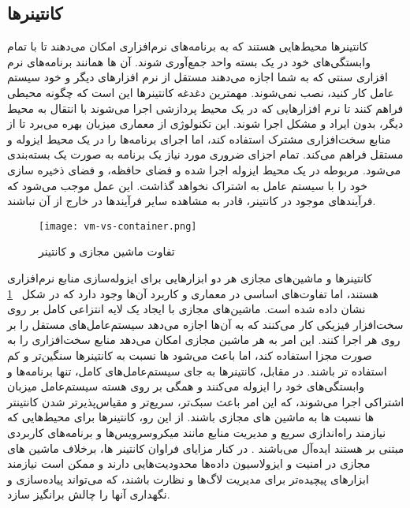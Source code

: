 \subsection{کانتینرها}

کانتینرها محیط‌هایی هستند که به برنامه‌های نرم‌افزاری امکان می‌دهند تا با تمام وابستگی‌های خود در یک بسته واحد جمع‌آوری شوند. آن ها همانند برنامه‌های نرم افزاری سنتی که به شما اجازه می‌دهند مستقل از نرم افزارهای دیگر و خود سیستم عامل کار کنید، نصب نمی‌شوند. مهمترین دغدغه کانتینرها این  است که چگونه محیطی فراهم کنند تا نرم افزارهایی که در یک محیط پردازشی اجرا می‌شوند با انتقال به محیط دیگر، بدون ایراد و مشکل اجرا شوند. این تکنولوژی از معماری میزبان بهره می‌برد تا از منابع سخت‌افزاری مشترک استفاده کند، اما اجرای برنامه‌ها را در یک محیط ایزوله و مستقل فراهم می‌کند. تمام اجزای ضروری مورد نیاز یک برنامه به صورت یک  بسته‌بندی می‌شود.  مربوطه در یک محیط ایزوله اجرا شده و فضای حافظه،  و فضای ذخیره سازی خود را با سیستم عامل به اشتراک نخواهد گذاشت. این عمل موجب می‌شود که فرآیند‌های موجود در کانتینر، قادر به مشاهده‌ سایر فرآیندها در خارج از آن نباشند.
\begin{figure}[t]
	\centering
	\texttt{[image: vm-vs-container.png]}
	\caption{تفاوت ماشین مجازی و کانتینر}
	\label{fig: vm vs container}
\end{figure}


کانتینرها و ماشین‌های مجازی هر دو ابزارهایی برای ایزوله‌سازی منابع نرم‌افزاری هستند، اما تفاوت‌های اساسی در معماری و کاربرد آن‌ها وجود دارد که در شکل
~\ref{fig: vm vs container}
نشان داده شده است. ماشین‌های مجازی با ایجاد یک لایه انتزاعی کامل بر روی سخت‌افزار فیزیکی کار می‌کنند که به آن‌ها اجازه می‌دهد سیستم‌عامل‌های مستقل را بر روی هر  اجرا کنند. این امر به هر ماشین مجازی امکان می‌دهد منابع سخت‌افزاری را به صورت مجزا استفاده کند، اما باعث می‌شود ‌ها نسبت به کانتینرها سنگین‌تر و کم استفاده تر باشند. در مقابل، کانتینرها به جای سیستم‌عامل‌های کامل، تنها برنامه‌ها و وابستگی‌های خود را ایزوله می‌کنند و همگی بر روی هسته سیستم‌عامل میزبان اشتراکی اجرا می‌شوند، که این امر باعث سبک‌تر، سریع‌تر و مقیاس‌پذیرتر شدن کانتینتر ها نسبت ها به ماشین های مجازی باشند. از این رو، کانتینرها برای محیط‌هایی که نیازمند راه‌اندازی سریع و مدیریت منابع مانند میکروسرویس‌ها و برنامه‌های کاربردی مبتنی بر  هستند ایده‌آل می‌باشند \cite{Dockervm}. در کنار مزایای فراوان کانتینر ها، برخلاف ماشین های مجازی در امنیت و ایزولاسیون داده‌ها محدودیت‌هایی دارند و ممکن است نیازمند ابزارهای پیچیده‌تر برای مدیریت لاگ‌ها و نظارت باشند، که می‌تواند پیاده‌سازی و نگهداری آنها را چالش برانگیز سازد.



